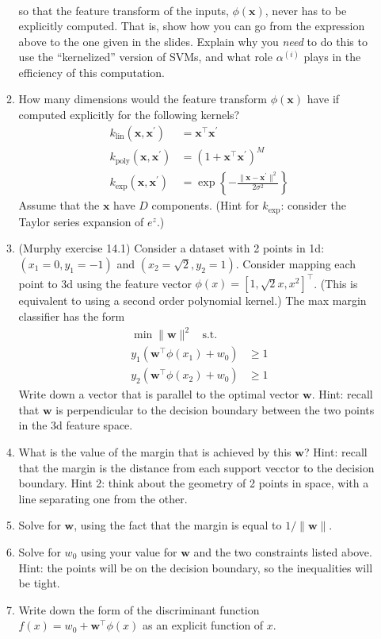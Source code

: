 \documentclass{article}
\begin{document}
\begin{enumerate}
\begin{enumerate}
\begin{align*}
		\end{align*}
		so that the feature transform of the inputs, \(\phi(\mathbf{x})\), never has to be explicitly computed. That is, show how you can go from the expression above to the one given in the slides. Explain why you \emph{need} to do this to use the ``kernelized'' version of SVMs, and what role \(\alpha^{(i)}\) plays in the efficiency of this computation.
		\item How many dimensions would the feature transform \(\phi(\mathbf{x})\) have if computed explicitly for the following kernels?
		\begin{align*}
			k_\text{lin}(\mathbf{x},\mathbf{x}^\prime) &= \mathbf{x}^\top\mathbf{x}^\prime\\
			k_\text{poly}(\mathbf{x},\mathbf{x}^\prime) &= (1+\mathbf{x}^\top\mathbf{x}^\prime)^M\\
			k_\text{exp}(\mathbf{x},\mathbf{x}^\prime) &= \exp\left\{-\frac{\lVert\mathbf{x}-\mathbf{x}^\prime\rVert^2}{2\sigma^2}\right\}
		\end{align*}
		Assume that the \(\mathbf{x}\) have \(D\) components. (Hint for \(k_\text{exp}\): consider the Taylor series expansion of \(e^z\).)
		\item (Murphy exercise 14.1) Consider a dataset with 2 points in 1d: \((x_1=0,y_1=-1)\) and \((x_2=\sqrt{2},y_2=1)\). Consider mapping each point to 3d using the feature vector \(\phi(x)=[1, \sqrt{2}x, x^2]^\top\). (This is equivalent to using a second order polynomial kernel.) The max margin classifier has the form
		\begin{align*}
			\min \lVert\mathbf{w}\rVert^2~~~~\text{s.t.}&\\
			y_1(\mathbf{w}^\top\phi(x_1)+w_0)&\geq 1\\
			y_2(\mathbf{w}^\top\phi(x_2)+w_0)&\geq 1
		\end{align*}
		Write down a vector that is parallel to the optimal vector \(\mathbf{w}\). Hint: recall that \(\mathbf{w}\) is perpendicular to the decision boundary between the two points in the 3d feature space.
		\item What is the value of the margin that is achieved by this \(\mathbf{w}\)? Hint: recall that the margin is the distance from each support vecctor to the decision boundary. Hint 2: think about the geometry of 2 points in space, with a line separating one from the other.
		\item Solve for \(\mathbf{w}\), using the fact that the margin is equal to \(1/\lVert\mathbf{w}\rVert\).
		\item Solve for \(w_0\) using your value for \(\mathbf{w}\) and the two constraints listed above. Hint: the points will be on the decision boundary, so the inequalities will be tight.
		\item Write down the form of the discriminant function \(f(x) = w_0+\mathbf{w}^\top\phi(x)\) as an explicit function of \(x\).
	\end{enumerate}
\end{enumerate}
\end{document}
